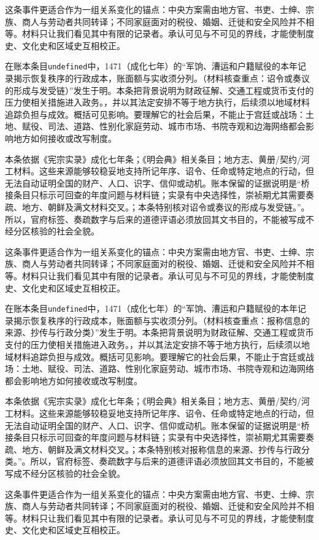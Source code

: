 这条事件更适合作为一组关系变化的锚点：中央方案需由地方官、书吏、士绅、宗族、商人与劳动者共同转译；不同家庭面对的税役、婚姻、迁徙和安全风险并不相等。材料只让我们看见其中有限的记录者。承认可见与不可见的界线，才能使制度史、文化史和区域史互相校正。

在账本条目\texttt{undefined}中，1471（成化七年）的“军饷、漕运和户籍赋役的本年记录揭示恢复秩序的行政成本，账面额与实收须分列。（材料核查重点：诏令或奏议的形成与发受链）”发生于明。本条把背景说明为财政征解、交通工程或货币支付的压力使相关措施进入政务。，并以其法定安排不等于地方执行，后续须以地域材料追踪负担与成效。概括可见影响。要理解它的社会后果，不能止于宫廷或战场：土地、赋役、司法、道路、性别化家庭劳动、城市市场、书院寺观和边海网络都会影响地方如何接收或改写制度。

本条依据《宪宗实录》成化七年条；《明会典》相关条目；地方志、黄册/契约/河工材料。这些来源能够较稳妥地支持所记年序、诏令、任命或特定地点的行动，但无法自动证明全国的财产、人口、识字、信仰或动机。账本保留的证据说明是“桥接条目只标示可回查的年度问题与材料链；实录有中央选择性，崇祯期尤其需要奏疏、地方、朝鲜及满文材料交叉。；本条特别核对诏令或奏议的形成与发受链。”。所以，官府标签、奏疏数字与后来的道德评语必须放回其文书目的，不能被写成不经分区核验的社会全貌。

这条事件更适合作为一组关系变化的锚点：中央方案需由地方官、书吏、士绅、宗族、商人与劳动者共同转译；不同家庭面对的税役、婚姻、迁徙和安全风险并不相等。材料只让我们看见其中有限的记录者。承认可见与不可见的界线，才能使制度史、文化史和区域史互相校正。

在账本条目\texttt{undefined}中，1471（成化七年）的“军饷、漕运和户籍赋役的本年记录揭示恢复秩序的行政成本，账面额与实收须分列。（材料核查重点：报称信息的来源、抄传与行政分类）”发生于明。本条把背景说明为财政征解、交通工程或货币支付的压力使相关措施进入政务。，并以其法定安排不等于地方执行，后续须以地域材料追踪负担与成效。概括可见影响。要理解它的社会后果，不能止于宫廷或战场：土地、赋役、司法、道路、性别化家庭劳动、城市市场、书院寺观和边海网络都会影响地方如何接收或改写制度。

本条依据《宪宗实录》成化七年条；《明会典》相关条目；地方志、黄册/契约/河工材料。这些来源能够较稳妥地支持所记年序、诏令、任命或特定地点的行动，但无法自动证明全国的财产、人口、识字、信仰或动机。账本保留的证据说明是“桥接条目只标示可回查的年度问题与材料链；实录有中央选择性，崇祯期尤其需要奏疏、地方、朝鲜及满文材料交叉。；本条特别核对报称信息的来源、抄传与行政分类。”。所以，官府标签、奏疏数字与后来的道德评语必须放回其文书目的，不能被写成不经分区核验的社会全貌。

这条事件更适合作为一组关系变化的锚点：中央方案需由地方官、书吏、士绅、宗族、商人与劳动者共同转译；不同家庭面对的税役、婚姻、迁徙和安全风险并不相等。材料只让我们看见其中有限的记录者。承认可见与不可见的界线，才能使制度史、文化史和区域史互相校正。

